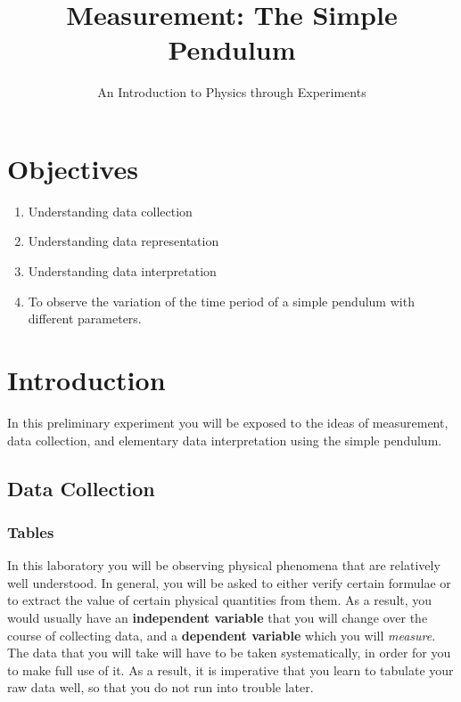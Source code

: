 \title{Measurement: The Simple Pendulum}
\author{An Introduction to Physics through Experiments}
\date{}

\maketitle

\section{Objectives}

\begin{enumerate}
    \item Understanding data collection
    \item Understanding data representation
    \item Understanding data interpretation
    \item To observe the variation of the time period of a simple pendulum with different parameters.
\end{enumerate}

\section{Introduction}

In this preliminary experiment you will be exposed to the ideas of measurement, data collection, and elementary data interpretation using the simple pendulum. 

\subsection{Data Collection}

\subsubsection{Tables}

In this laboratory you will be observing physical phenomena that are relatively well understood. In general, you will be asked to either verify certain formulae or to extract the value of certain physical quantities from them. As a result, you would usually have an \textbf{independent variable} that you will change over the course of collecting data, and a \textbf{dependent variable} which you will \textit{measure}. The data that you will take will have to be taken systematically, in order for you to make full use of it. As a result, it is imperative that you learn to tabulate your raw data well, so that you do not run into trouble later.

